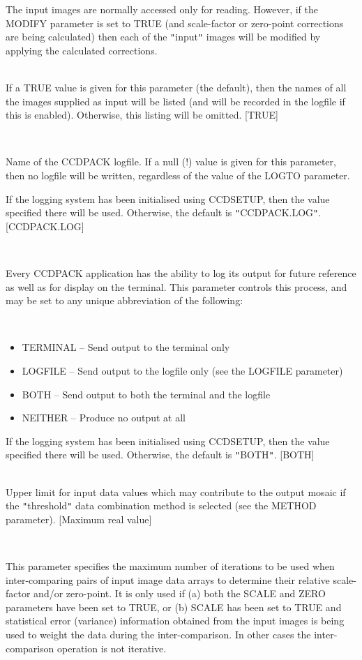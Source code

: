 \documentclass[twoside,11pt]{article}
\newcommand{\htmlref}[2]{#1}
\renewcommand{\_}{\texttt{\symbol{95}}}
\newcommand{\qt}[1]{{\tt "}#1{\tt "}}
\newcommand{\xroutine}[1]{\htmlref{{\sc #1}}{#1}}
\newcommand{\sstsubsection}[1]{ \item[{#1}] \mbox{} \\}
\newcommand{\sstitemlist}[1]{
  \mbox{} \\
  \vspace{-3.5ex}
  \begin{itemize}
     #1
  \end{itemize}
}
\newcommand{\sstitem}{\item}
\newcommand{\sstsubsection}[1]{\item[{#1}]}
\newcommand{\sstitemlist}[1]{
      \begin{itemize}
         #1
      \end{itemize}
      \\
   }
\newcommand{\sstitem}{\item}
\begin{document}
{{{         The input images are normally accessed only for reading.
         However, if the MODIFY parameter is set to TRUE (and
         scale-factor or zero-point corrections are being calculated)
         then each of the \qt{input} images will be modified by applying the
         calculated corrections.
      }
      \sstsubsection{
         LISTIN = \_LOGICAL (Read)
      } {
         If a TRUE value is given for this parameter (the default),
         then the names of all the images supplied as input will be
         listed (and will be recorded in the logfile if this is
         enabled).  Otherwise, this listing will be omitted.
         [TRUE]
      }
      \sstsubsection{
         LOGFILE = FILENAME (Read)
      } {
         Name of the CCDPACK logfile.  If a null (!) value is given for
         this parameter, then no logfile will be written, regardless of
         the value of the LOGTO parameter.

         If the logging system has been initialised using \xroutine{CCDSETUP},
         then the value specified there will be used. Otherwise, the
         default is \qt{CCDPACK.LOG}.
         [CCDPACK.LOG]
      }
      \sstsubsection{
         LOGTO = LITERAL (Read)
      } {
         Every CCDPACK application has the ability to log its output
         for future reference as well as for display on the terminal.
         This parameter controls this process, and may be set to any
         unique abbreviation of the following:
         \sstitemlist{

            \sstitem
               TERMINAL  -- Send output to the terminal only

            \sstitem
               LOGFILE   -- Send output to the logfile only (see the
                               LOGFILE parameter)

            \sstitem
               BOTH      -- Send output to both the terminal and the
                               logfile

            \sstitem
               NEITHER   -- Produce no output at all

         }
         If the logging system has been initialised using \xroutine{CCDSETUP},
         then the value specified there will be used. Otherwise, the
         default is \qt{BOTH}.
         [BOTH]
      }
      \sstsubsection{
         MAX = \_REAL (Read)
      } {
         Upper limit for input data values which may contribute to the
         output mosaic if the \qt{threshold} data combination method is
         selected (see the METHOD parameter). [Maximum real value]
      }
      \sstsubsection{
         MAXIT = \_INTEGER (Read)
      } {
         This parameter specifies the maximum number of iterations to
         be used when inter-comparing pairs of input image data arrays to
         determine their relative scale-factor and/or zero-point. It is
         only used if (a) both the SCALE and ZERO parameters have been
         set to TRUE, or (b) SCALE has been set to TRUE and statistical
         error (variance) information obtained from the input images is
         being used to weight the data during the inter-comparison. In
         other cases the inter-comparison operation is not iterative.

}}}
\end{document}
